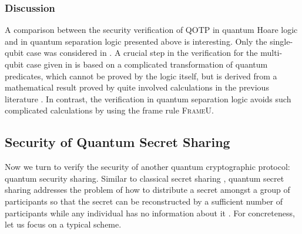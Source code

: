 \documentclass[conference,compsoc, 10pt]{IEEEtran}
\newcommand{\jh}[1]{\textit{\color{red}[JH] : #1}}
\newcommand{\lz}[1]{\textit{\color{blue}[LZ] : #1}}
\newcommand {\cH } {{\mathcal{H}}}
\def\>{\ensuremath{\rangle}}
\def\<{\ensuremath{\langle}}
\begin{document}
	\subsubsection{Discussion} A comparison between the security verification of QOTP in quantum Hoare logic \cite{Unr19b, BHY19} and in quantum separation logic presented above is interesting. Only the single-qubit case was considered in \cite{Unr19b}. A crucial step in the verification for the multi-qubit case given in \cite{BHY19} is based on a complicated transformation of quantum predicates, which cannot be proved by the logic itself, but is derived from a mathematical result proved by quite  involved calculations in the previous literature \cite{MTW00}. 
	In contrast, the verification in quantum separation logic avoids such complicated  calculations by using the frame rule \textsc{FrameU}.
	
	\subsection{Security of Quantum Secret Sharing}
	
  Now we turn to verify the security of another quantum cryptographic protocol:
  quantum security sharing. Similar to classical secret sharing
  \cite{Bla79,Sha79}, quantum secret sharing addresses the problem of how to
  distribute a secret amongst a group of participants so that the secret can be
  reconstructed by a sufficient number of participants while any individual has
  no information about it \cite{HBB99, CGL99}. For concreteness, let us focus on
  a typical scheme.
	
\end{document}
